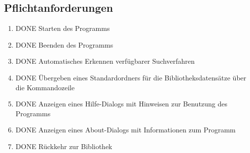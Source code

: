 \subsection{Pflichtanforderungen}
\begin{enumerate} [label=\bfseries /F \arabic*0/, leftmargin=*]
	\item DONE Starten des Programms
	\item DONE Beenden des Programms
	\item DONE Automatisches Erkennen verfügbarer Suchverfahren
	\item DONE Übergeben eines Standardordners für die Bibliotheksdatensätze über die Kommandozeile
	\item DONE Anzeigen eines Hilfe-Dialogs mit Hinweisen zur Benutzung des Programms
	\item DONE Anzeigen eines About-Dialogs mit Informationen zum Programm
	\item DONE Rückkehr zur Bibliothek
	\newline
 

\end{enumerate}
